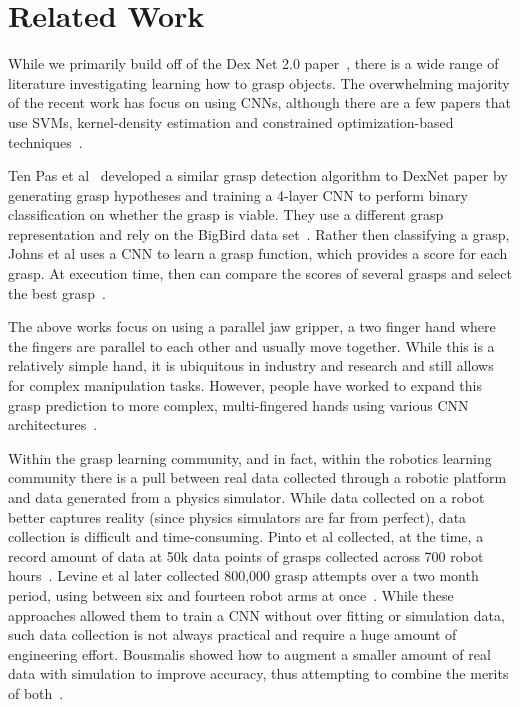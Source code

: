 
\section{Related Work}
\label{sec:related_work}

While we primarily build off of the Dex Net 2.0 paper~\cite{mahler2017dex}, there is a wide range of literature investigating learning how to grasp objects. 
The overwhelming majority of the recent work has focus on using CNNs, although there are a few papers that use SVMs, kernel-density estimation and constrained optimization-based techniques~\cite{jiang2011efficient,kopicki2016one,el2012bridging}. 

Ten Pas et al~\cite{pas2017grasp} developed a similar grasp detection algorithm to DexNet paper by generating grasp hypotheses and training a 4-layer CNN to perform binary classification on whether the grasp is viable. 
They use a different grasp representation and rely on the BigBird data set~\cite{singh2014bigbird}. 
Rather then classifying a grasp, Johns et al uses a CNN to learn a grasp function, which provides a score for each grasp. 
At execution time, then can compare the scores of several grasps and select the best grasp~\cite{johns2016deep}. 

The above works focus on using a parallel jaw gripper, a two finger hand where the fingers are parallel to each other and usually move together. 
While this is a relatively simple hand, it is ubiquitous in industry and research and still allows for complex manipulation tasks. 
However, people have worked to expand this grasp prediction to more complex, multi-fingered hands using various CNN architectures~\cite{luplanning,varley2015generating,zhou20176dof}. 

Within the grasp learning community, and in fact, within the robotics learning community there is a pull between real data collected through a robotic platform and data generated from a physics simulator. 
While data collected on a robot better captures reality (since physics simulators are far from perfect), data collection is difficult and time-consuming. 
Pinto et al collected, at the time, a record amount of data at 50k data points of grasps collected across 700 robot hours~\cite{pinto2016supersizing}.
Levine et al later collected 800,000 grasp attempts over a two month period, using between six and fourteen robot arms at once~\cite{levine2016learning}. 
While these approaches allowed them to train a CNN without over fitting or simulation data, such data collection is not always practical and require a huge amount of engineering effort. 
Bousmalis showed how to augment a smaller amount of real data with simulation to improve accuracy, thus attempting to combine the merits of both~\cite{bousmalis2017using}. 

